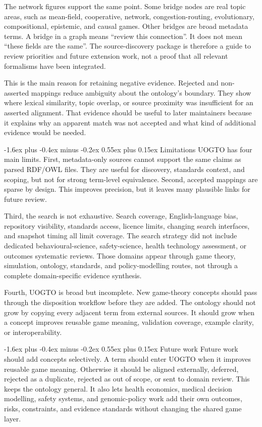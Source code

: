 \documentclass[11pt]{article}
\makeatletter
\renewcommand\subsection{\@startsection{subsection}{2}{\z@}%
  {-1.6ex plus -0.4ex minus -0.2ex}%
  {0.55ex plus 0.15ex}%
  {\normalfont\large\bfseries\color{uogtoInk}}}
\makeatother
\begin{document}
The network figures support the same point. Some bridge nodes are real topic areas, such as mean-field, cooperative, network, congestion-routing, evolutionary, compositional, epistemic, and causal games. Other bridges are broad metadata terms. A bridge in a graph means ``review this connection''. It does not mean ``these fields are the same''. The source-discovery package is therefore a guide to review priorities and future extension work, not a proof that all relevant formalisms have been integrated.

This is the main reason for retaining negative evidence. Rejected and non-asserted mappings reduce ambiguity about the ontology's boundary. They show where lexical similarity, topic overlap, or source proximity was insufficient for an asserted alignment. That evidence should be useful to later maintainers because it explains why an apparent match was not accepted and what kind of additional evidence would be needed.

\subsection{Limitations}
UOGTO has four main limits. First, metadata-only sources cannot support the same claims as parsed RDF/OWL files. They are useful for discovery, standards context, and scoping, but not for strong term-level equivalence. Second, accepted mappings are sparse by design. This improves precision, but it leaves many plausible links for future review.

Third, the search is not exhaustive. Search coverage, English-language bias, repository visibility, standards access, licence limits, changing search interfaces, and snapshot timing all limit coverage. The search strategy did not include dedicated behavioural-science, safety-science, health technology assessment, or outcomes systematic reviews. Those domains appear through game theory, simulation, ontology, standards, and policy-modelling routes, not through a complete domain-specific evidence synthesis.

Fourth, UOGTO is broad but incomplete. New game-theory concepts should pass through the disposition workflow before they are added. The ontology should not grow by copying every adjacent term from external sources. It should grow when a concept improves reusable game meaning, validation coverage, example clarity, or interoperability.

\subsection{Future work}
Future work should add concepts selectively. A term should enter UOGTO when it improves reusable game meaning. Otherwise it should be aligned externally, deferred, rejected as a duplicate, rejected as out of scope, or sent to domain review. This keeps the ontology general. It also lets health economics, medical decision modelling, safety systems, and genomic-policy work add their own outcomes, risks, constraints, and evidence standards without changing the shared game layer.
\end{document}
